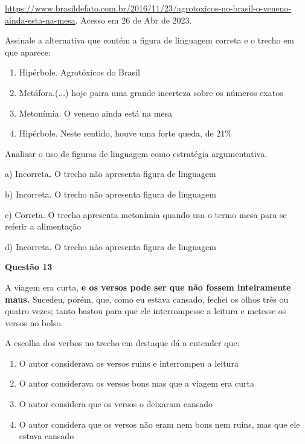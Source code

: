\href{https://www.brasildefato.com.br/2016/11/23/agrotoxicos-no-brasil-o-veneno-ainda-esta-na-mesa}{{https://www.brasildefato.com.br/2016/11/23/agrotoxicos-no-brasil-o-veneno-ainda-esta-na-mesa}}.
Acesso em 26 de Abr de 2023.

Assinale a alternativa que contém a figura de linguagem correta e o
trecho em que aparece:

\begin{enumerate}
\def\labelenumi{\alph{enumi})}
\item
  Hipérbole. Agrotóxicos do Brasil
\item
  Metáfora.(...) hoje paira uma grande incerteza sobre os números exatos
\item
  Metonímia. O veneno ainda está na mesa
\item
  Hipérbole. Neste sentido, houve uma forte queda, de 21\%
\end{enumerate}

Analisar o uso de figuras de linguagem como estratégia argumentativa.

a) Incorreta\textbf{.} O trecho não apresenta figura de linguagem

b) Incorreta. O trecho não apresenta figura de linguagem

c) Correta. O trecho apresenta metonímia quando usa o termo mesa para se
referir a alimentação

d) Incorreta. O trecho não apresenta figura de linguagem

\textbf{Questão 13}

A viagem era curta, \textbf{e os versos pode ser que não fossem
inteiramente maus.} Sucedeu, porém, que, como eu estava cansado, fechei
os olhos três ou quatro vezes; tanto bastou para que ele interrompesse a
leitura e metesse os versos no bolso.

A escolha dos verbos no trecho em destaque dá a entender que:

\begin{enumerate}
\def\labelenumi{\alph{enumi})}
\item
  O autor considerava os versos ruins e interrompeu a leitura
\item
  O autor considerava os versos bons mas que a viagem era curta
\item
  O autor considera que os versos o deixaram cansado
\item
  O autor considera que os versos não eram nem bons nem ruins, mas que
  ele estava cansado
\end{enumerate}

